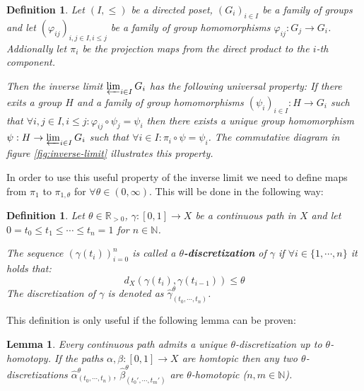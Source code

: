 \documentclass[a4paper, 11pt, twoside]{article}
\newcommand{\R}[0]{\mathbb{R}}
\newcommand{\N}[0]{\mathbb{N}}
\theoremstyle{break}
\theoremstyle{break}
\newtheorem{defin}[thm]{Definition}
\newtheorem{lemma}[thm]{Lemma}
\begin{document}
\begin{defin}
  Let $(I, \leq)$ be a directed poset, $(G_i)_{i\in I}$ be a family of groups and let $(\varphi_{ij})_{i,j \in I, i \leq j}$ be a family of group homomorphisms $\varphi_{ij}: G_j \to G_i$.
  Addionally let $\pi_i$ be the projection maps from the direct product to the $i$-th component.
  
  Then the inverse limit $\varprojlim_{i\in I} G_i$ has the following universal property:
  If there exits a group $H$ and a family of group homomorphisms $(\psi_i)_{i\in I}: H \to G_i$ such that $\forall i,j \in I, i \leq j: \varphi_{ij} \circ \psi_j = \psi_i$ then there exists a unique group homomorphism $\psi: H \to \varprojlim_{i\in I} G_i$ such that $\forall i \in I: \pi_i \circ \psi = \psi_i$.
  The commutative diagram in figure \ref{fig:inverse-limit} illustrates this property.
\end{defin}


In order to use this useful property of the inverse limit we need to define maps from $\pi_1$ to $\pi_{1,\theta}$ for $\forall \theta \in (0,\infty)$. This will be done in the following way:
\begin{defin}
  Let $\theta \in \R_{>0}$, $\gamma: [0,1] \to X$ be a continuous path in $X$ and let $0 = t_0 \leq t_1 \leq \cdots \leq t_n = 1$ for $n \in \N$.

  The sequence $(\gamma(t_i))_{i=0}^n$ is called a \textbf{$\theta$-discretization} of $\gamma$ if $\forall i \in \{1, \cdots, n\}$ it holds that:
  \begin{equation*}
    d_X(\gamma(t_{i}), \gamma(t_{i-1})) \leq \theta
  \end{equation*}
  The discretization of $\gamma$ is denoted as $\widehat{\gamma}^{\theta}_{(t_0, \cdots, t_n)}$.
\end{defin}

This definition is only useful if the following lemma can be proven:

\begin{lemma}\label{lem:discretization}
  Every continuous path admits a unique $\theta$-discretization up to $\theta$-homotopy. If the paths $\alpha, \beta: [0,1] \to X$ are homtopic then any two $\theta$-discretizations 
  $\widehat{\alpha}^{\theta}_{(t_0, \cdots, t_n)}$, $\widehat{\beta}^{\theta}_{(t_0', \cdots, t_m')}$ are $\theta$-homotopic ($n,m \in \N$).
\end{lemma}
\end{document}
